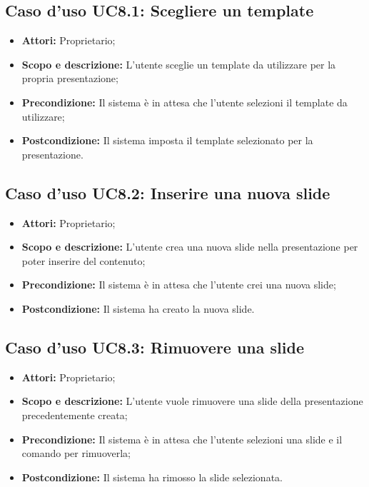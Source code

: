 \subsection{Caso d'uso UC8.1: Scegliere un template}
\begin{itemize}
	\item \textbf{Attori:} Proprietario;
	\item \textbf{Scopo e descrizione:} L'utente sceglie un template da utilizzare per la propria presentazione;
	\item \textbf{Precondizione:} Il sistema è in attesa che l'utente selezioni il template da utilizzare;
	\item \textbf{Postcondizione:} Il sistema imposta il template selezionato per la presentazione.
\end{itemize}


\subsection{Caso d'uso UC8.2: Inserire una nuova slide}
\begin{itemize}
	\item \textbf{Attori:} Proprietario;
	\item \textbf{Scopo e descrizione:} L'utente crea una nuova slide nella presentazione per poter inserire del contenuto;
	\item \textbf{Precondizione:} Il sistema è in attesa che l'utente crei una nuova slide;
	\item \textbf{Postcondizione:} Il sistema ha creato la nuova slide.
\end{itemize}


\subsection{Caso d'uso UC8.3: Rimuovere una slide}
\begin{itemize}
	\item \textbf{Attori:} Proprietario;
	\item \textbf{Scopo e descrizione:} L'utente vuole rimuovere una slide della presentazione precedentemente creata;
	\item \textbf{Precondizione:} Il sistema è in attesa che l'utente selezioni una slide e il comando per rimuoverla;
	\item \textbf{Postcondizione:} Il sistema ha rimosso la slide selezionata.
\end{itemize}


